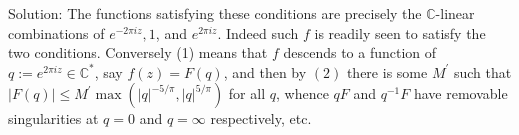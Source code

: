 \documentclass[10pt]{article}
\begin{document}
Solution: The functions satisfying these conditions are precisely the $\mathbb{C}$-linear combinations of $e^{-2 \pi i z}, 1$, and $e^{2 \pi i z}$. Indeed such $f$ is readily seen to satisfy the two conditions. Conversely (1) means that $f$ descends to a function of $q:=e^{2 \pi i z} \in \mathbb{C}^{*}$, say $f(z)=F(q)$, and then by $(2)$ there is some $M^{\prime}$ such that $|F(q)| \leq M^{\prime} \max \left(|q|^{-5 / \pi},|q|^{5 / \pi}\right)$ for all $q$, whence $q F$ and $q^{-1} F$ have removable singularities at $q=0$ and $q=\infty$ respectively, etc.
\end{document}

